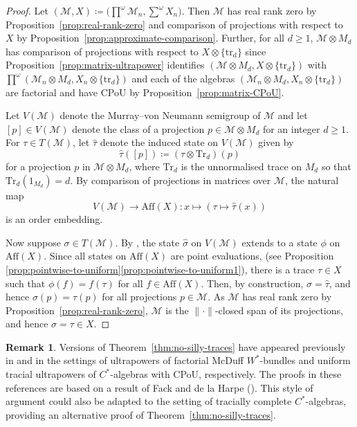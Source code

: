 \documentclass[a4paper,11pt]{amsart}
\theoremstyle{definition}
\newtheorem{remark}[theorem]{Remark}
\numberwithin{equation}{section}
\numberwithin{theorem}{section}
\newcommand{\M}{\mathcal{M}}
\begin{document}
\begin{proof}
	Let $(\M, X) \coloneqq \big(\prod^\omega \M_n, \sum^\omega X_n\big)$.  Then $\M$ has real rank zero by Proposition~\ref{prop:real-rank-zero} and comparison of projections with respect to $X$ by Proposition~\ref{prop:approximate-comparison}.  Further, for all $d \geq 1$, $\M \otimes M_d$ has comparison of projections with respect to $X \otimes \{\mathrm{tr_d}\}$ since Proposition~\ref{prop:matrix-ultrapower} identifies $(\M \otimes M_d, X \otimes \{\mathrm{tr}_d\})$ with $\prod^\omega (\M_n \otimes M_d, X_n \otimes \{\mathrm{tr}_d\})$ and each of the algebras $(\mathcal M_n \otimes M_d, X_n \otimes \{\mathrm{tr}_d\})$  are factorial and have CPoU by Proposition~\ref{prop:matrix-CPoU}.
	
	Let $V(\M)$ denote the Murray--von Neumann semigroup of $\M$ and let $[p] \in V(\M)$ denote the class of a projection $p \in \M \otimes M_d$ for an integer $d \geq 1$.  For $\tau \in T(\M)$, let $\hat{\tau}$ denote the induced state on $V(\M)$ given by
	\begin{equation}
		\hat{\tau}([p]) \coloneqq (\tau \otimes \mathrm{Tr}_d)(p)
	\end{equation}
	for a projection $p$ in $\M \otimes M_d$, where $\mathrm{Tr}_d$ is the unnormalised trace on $M_d$ so that $\mathrm{Tr}_d(1_{M_d}) = d$. By comparison of projections in matrices over $\M$, the natural map
	\begin{equation}
		V(\M) \rightarrow \mathrm{Aff}(X) \colon x \mapsto (\tau \mapsto \hat{\tau}(x))
	\end{equation}
	is an order embedding.
	
	Now suppose $\sigma \in T(\M)$.  By \cite[Corollary~2.7]{Blackadar-Rordam92}, the state $\hat{\sigma}$ on $V(\M)$ extends to a state $\phi$ on $\mathrm{Aff}(X)$.  Since all states on $\mathrm{Aff}(X)$ are point evaluations, (see Proposition \ref{prop:pointwise-to-uniform}\ref{prop:pointwise-to-uniform1}), there is a trace $\tau \in X$ such that $\phi(f) = f(\tau)$ for all $f \in \mathrm{Aff}(X)$.  Then, by construction, $\hat{\sigma} = \hat{\tau}$, and hence $\sigma(p) = \tau(p)$ for all projections $p \in \M$.  As $\M$ has real rank zero by Proposition~\ref{prop:real-rank-zero}, $\M$ is the $\|\cdot\|$-closed span of its projections, and hence $\sigma = \tau \in X$.
\end{proof}

\begin{remark}\label{rmk:commutators}
	Versions of Theorem~\ref{thm:no-silly-traces} have appeared previously in \cite[Proposition~3.22]{BBSTWW} and \cite[Proposition~4.6]{CETWW} in the settings of ultrapowers of factorial McDuff $W^*$-bundles and uniform tracial ultrapowers of $C^*$-algebras with CPoU, respectively.  The proofs in these references are based on a result of Fack and de la Harpe (\cite[Th{\'e}or{\`e}me~2.3]{FH80}). This style of argument could also be adapted to the setting of tracially complete $C^*$-algebras, providing an alternative proof of Theorem~\ref{thm:no-silly-traces}.
\end{remark}
\end{document}
